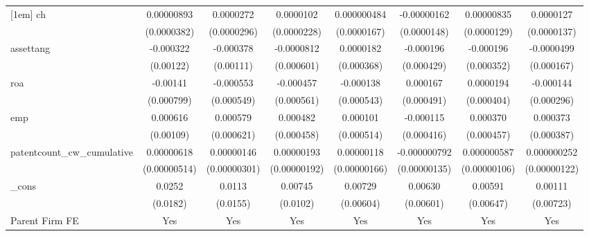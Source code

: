 {\begin{tabular}{l*{7}{c}}
[1em]
ch          &  0.00000893         &   0.0000272         &   0.0000102         & 0.000000484         & -0.00000162         &  0.00000835         &   0.0000127         \\
            & (0.0000382)         & (0.0000296)         & (0.0000228)         & (0.0000167)         & (0.0000148)         & (0.0000129)         & (0.0000137)         \\
[1em]
assettang   &   -0.000322         &   -0.000378         &  -0.0000812         &   0.0000182         &   -0.000196         &   -0.000196         &  -0.0000499         \\
            &   (0.00122)         &   (0.00111)         &  (0.000601)         &  (0.000368)         &  (0.000429)         &  (0.000352)         &  (0.000167)         \\
[1em]
roa         &    -0.00141         &   -0.000553         &   -0.000457         &   -0.000138         &    0.000167         &   0.0000194         &   -0.000144         \\
            &  (0.000799)         &  (0.000549)         &  (0.000561)         &  (0.000543)         &  (0.000491)         &  (0.000404)         &  (0.000296)         \\
[1em]
emp         &    0.000616         &    0.000579         &    0.000482         &    0.000101         &   -0.000115         &    0.000370         &    0.000373         \\
            &   (0.00109)         &  (0.000621)         &  (0.000458)         &  (0.000514)         &  (0.000416)         &  (0.000457)         &  (0.000387)         \\
[1em]
patentcount\_cw\_cumulative&  0.00000618         &  0.00000146         &  0.00000193         &  0.00000118         &-0.000000792         & 0.000000587         & 0.000000252         \\
            &(0.00000514)         &(0.00000301)         &(0.00000192)         &(0.00000166)         &(0.00000135)         &(0.00000106)         &(0.00000122)         \\
[1em]
\_cons      &      0.0252         &      0.0113         &     0.00745         &     0.00729         &     0.00630         &     0.00591         &     0.00111         \\
            &    (0.0182)         &    (0.0155)         &    (0.0102)         &   (0.00604)         &   (0.00601)         &   (0.00647)         &   (0.00723)         \\
[1em]
Parent Firm FE&         Yes         &         Yes         &         Yes         &         Yes         &         Yes         &         Yes         &         Yes         \\

\end{tabular}}
